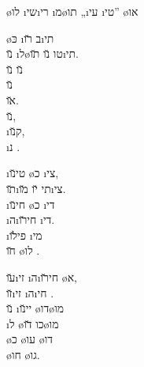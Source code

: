 \textheader
{\o{לו} \i{שי}\i{רי} \i{מ}\o{תו} „\i{עי}  \i{טי}”}
{ \o{או}}
{}
{}
{}
{}
{}


\begin{twocol}
\begin{stanza}
\o{כּ}  \i{ב} \u{רו}\i{תי}\\
\u{נו} \i{ל}\o{טו} \u{נו} \u{תו}\i{תי}.\\
\u{נו} \u{נו}\\
 \u{נו}\\
  \u{או}.\\
 \u{נו},\\
 \i{ק}\u{נו},\\
  \i{נ} .
\end{stanza}

\begin{stanza}
\i{טי}\u{נו}  \o{כ} \i{צי},\\
\u{תו}\i{תי} \u{יו} \u{מו}\i{צי}.\\
\i{חי}\u{נו} \o{כ} \i{די}\\
\i{ה}\i{חי}\u{רו}  \i{די}.\\
\i{פי}\u{לו} \i{מי} \\
\u{חו} \o{לו}  .
\end{stanza}

\begin{stanza}
\u{עו}\i{זי} \i{ה}\i{חי}\u{רו} \o{א},\\
\u{זו}\i{זי} \i{ה}\i{חי} .\\
\u{נו} \i{יי}\u{נו} \o{דו}\o{מו}\\
\i{ל} \o{כו} \u{דו}\o{מו}\\
\o{כ} \o{עו} \o{דו}\\
  \o{חו} \o{גו}.
\end{stanza}
\end{twocol}



